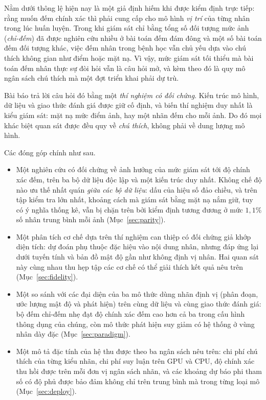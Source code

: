 \documentclass[preprint,12pt]{elsarticle}
\begin{document}
Nằm dưới thông lệ hiện nay là một giả định hiếm khi được kiểm định trực tiếp: rằng muốn đếm chính xác thì phải
cung cấp cho mô hình \emph{vị trí} của từng nhân trong lúc huấn luyện. Trong khi giám sát chỉ bằng tổng số đối
tượng mức ảnh (\emph{chỉ-đếm}) đã được nghiên cứu nhiều ở bài toán đếm đám đông và một số bài toán đếm đối tượng
khác, việc đếm nhân trong bệnh học vẫn chủ yếu dựa vào chú thích không gian như điểm hoặc mặt nạ. Vì vậy, mức
giám sát tối thiểu mà bài toán đếm nhân thực sự đòi hỏi vẫn là câu hỏi mở, và kèm theo đó là quy mô ngân sách chú
thích mà một đợt triển khai phải dự trù.

Bài báo trả lời câu hỏi đó bằng một \emph{thí nghiệm có đối chứng}. Kiến trúc mô hình, dữ liệu và giao thức đánh
giá được giữ cố định, và biến thí nghiệm duy nhất là kiểu giám sát: mặt nạ mức điểm ảnh, hay một nhãn đếm cho mỗi
ảnh. Do đó mọi khác biệt quan sát được đều quy về \emph{chú thích}, không phải về dung lượng mô hình.

Các đóng góp chính như sau.
\begin{itemize}
\item Một nghiên cứu có đối chứng về ảnh hưởng của mức giám sát tới độ chính xác đếm, trên ba bộ dữ liệu độc lập
và một kiến trúc duy nhất. Không chế độ nào ưu thế nhất quán \emph{giữa các bộ dữ liệu}: dấu của hiệu số đảo
chiều, và trên tập kiểm tra lớn nhất, khoảng cách mà giám sát bằng mặt nạ nắm giữ, tuy có ý nghĩa thống kê, vẫn
bị chặn trên bởi kiểm định tương đương ở mức $1{,}1\%$ số nhân trung bình mỗi ảnh (Mục~\ref{sec:parity}).
\item Một phân tích cơ chế dựa trên thí nghiệm can thiệp có đối chứng giả khớp diện tích: dự đoán phụ thuộc đặc
hiệu vào nội dung nhân, nhưng đáp ứng lại dưới tuyến tính và bản đồ mật độ gần như không định vị nhân. Hai quan
sát này cùng nhau thu hẹp tập các cơ chế có thể giải thích kết quả nêu trên (Mục~\ref{sec:fidelity}).
\item Một so sánh với các đại diện của ba mô thức dùng nhãn định vị (phân đoạn, ước lượng mật độ và phát hiện)
trên cùng dữ liệu và cùng giao thức đánh giá: bộ đếm chỉ-đếm nhẹ đạt độ chính xác đếm cao hơn cả ba trong cấu
hình thông dụng của chúng, còn mô thức phát hiện suy giảm có hệ thống ở vùng nhân dày đặc (Mục~\ref{sec:paradigm}).
\item Một mô tả đặc tính của hệ thu được theo ba ngân sách nêu trên: chi phí chú thích của từng kiểu nhãn, chi phí
suy luận trên GPU và CPU, độ chính xác thu hồi được trên mỗi đơn vị ngân sách nhãn, và các khoảng dự báo phi tham
số có độ phủ được bảo đảm không chỉ trên trung bình mà trong từng loại mô (Mục~\ref{sec:deploy}).
\end{itemize}
\end{document}
